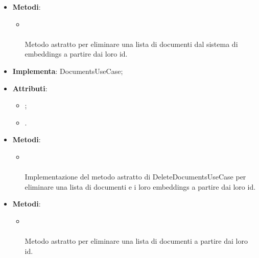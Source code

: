 \documentclass[10pt, a4paper]{article}
\begin{document}
\label{DeleteDocumentsPortDettaglio}
\begin{itemize}
    \item \textbf{Metodi}:
    \begin{itemize}
        \item {}\\ \\
        Metodo astratto per eliminare una lista di documenti dal sistema di embeddings a partire dai loro id.
    \end{itemize}
\end{itemize}

\label{DeleteDocumentsServiceDettaglio}
\begin{itemize}
    \item \textbf{Implementa}: DocumentsUseCase;
    \item \textbf{Attributi}:
    \begin{itemize}
        \item {};
        \item {}. 
    \end{itemize}
    \item \textbf{Metodi}:
    \begin{itemize}
        \item {}\\ \\
        Implementazione del metodo astratto di DeleteDocumentsUseCase per eliminare una lista di documenti e i loro embeddings a partire dai loro id.
    \end{itemize}
\end{itemize}


\label{DeleteDocumentsUseCaseDettaglio}
\begin{itemize}
    \item \textbf{Metodi}:
    \begin{itemize}
        \item {}\\ \\
        Metodo astratto per eliminare una lista di documenti a partire dai loro id.
    \end{itemize}
\end{itemize}
\end{document}

